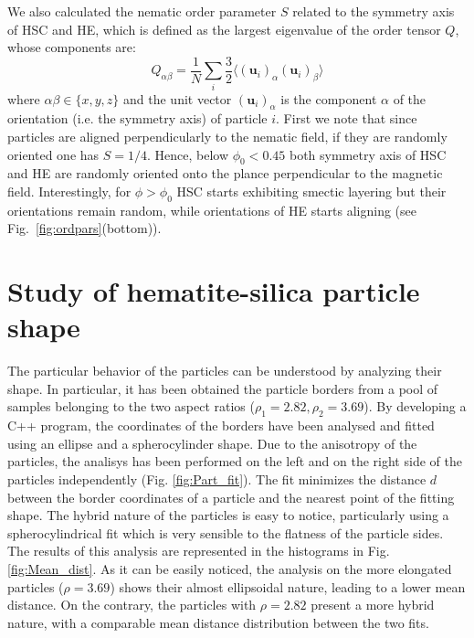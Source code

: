 \documentclass[aip,graphicx]{revtex4-1}
\begin{document}
We also calculated the nematic order parameter $S$ related to the symmetry axis of HSC and HE, which
is defined as the largest eigenvalue of the order tensor $Q$, whose components are:
\begin{equation}
Q_{\alpha\beta} = \frac{1}{N} \sum_i \frac{3}{2} \langle (\mathbf{u}_i)_\alpha (\mathbf{u}_i)_\beta\rangle
\label{eq:nemop}
\end{equation}
where $\alpha\beta\in\{x,y,z\}$ and the unit vector $(\mathbf{u}_i)_\alpha$ is the component $\alpha$ of the orientation (i.e. the symmetry axis) of particle $i$.
First we note that since particles are aligned perpendicularly to the nematic field, if they are 
randomly oriented one has $S=1/4$. Hence, below $\phi_0 < 0.45$ both symmetry axis of HSC and HE are 
randomly oriented onto the plance perpendicular to the magnetic field.
Interestingly, for $\phi > \phi_0$ HSC starts exhibiting smectic layering but their orientations
remain random, while orientations of HE starts aligning (see Fig.~\ref{fig:ordpars}(bottom)).

\section{Study of hematite-silica particle shape}

The particular behavior of the particles can be understood by analyzing their shape. In particular, it has been obtained the particle borders from a pool of samples belonging to the two aspect ratios ($\rho_1 = 2.82, \rho_2 = 3.69$). By developing a C++ program, the coordinates of the borders have been analysed and fitted using an ellipse and a spherocylinder shape. Due to the anisotropy of the particles, the analisys has been performed on the left and on the right side of the particles independently (Fig. \ref{fig:Part_fit}). The fit minimizes the distance $d$ between the border coordinates of a particle and the nearest point of the fitting shape. The hybrid nature of the particles is easy to notice, particularly using a spherocylindrical fit which is very sensible to the flatness of the particle sides. The results of this analysis are represented in the histograms in Fig. \ref{fig:Mean_dist}. As it can be easily noticed, the analysis on the more elongated particles ($\rho = 3.69$) shows their almost ellipsoidal nature, leading to a lower mean distance. On the contrary, the particles with $\rho = 2.82$ present a more hybrid nature, with a comparable mean distance distribution between the two fits.
\end{document}
